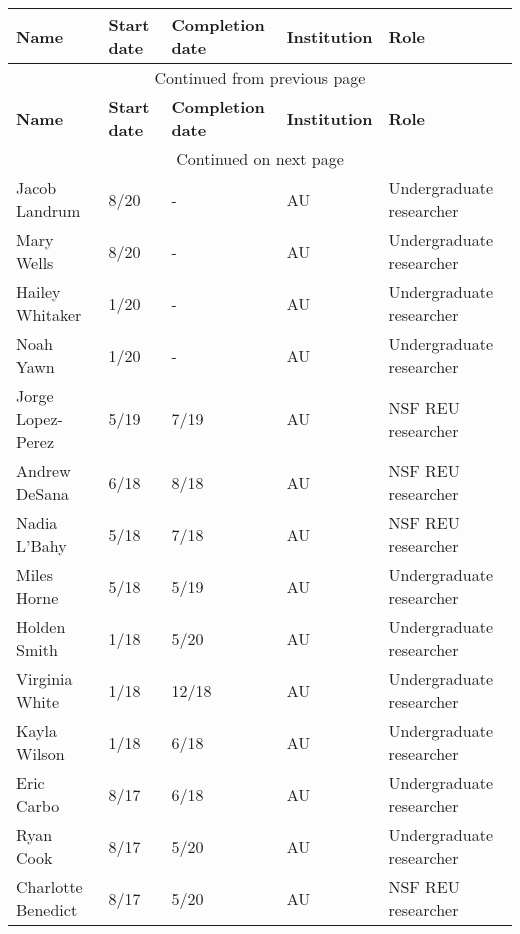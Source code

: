 {\sffamily\small
{}
\begin{longtable}[l]{ p{1.2in} p{0.5in} p{0.8in}p{0.75in} p{2in} }
    \hline
    \textbf{Name} & \textbf{Start date} & \textbf{Completion date} & \textbf{Institution} & \textbf{Role} \\
    \hline
    \endfirsthead
    \multicolumn{5}{c}{{Continued from previous page}} \\
    \hline
    \textbf{Name} & \textbf{Start date} & \textbf{Completion date} & \textbf{Institution} & \textbf{Role} \\
    \hline
    \endhead
    \hline \multicolumn{5}{c}{{Continued on next page}} \\
    \endfoot
    \hline
    \endlastfoot
    Jacob Landrum & 8/20 & - & AU & Undergraduate researcher \\
    Mary Wells & 8/20 & - & AU & Undergraduate researcher \\
    Hailey Whitaker & 1/20 & - & AU & Undergraduate researcher \\
    Noah Yawn & 1/20 & - & AU & Undergraduate researcher \\
    Jorge Lopez-Perez & 5/19 & 7/19 & AU & NSF REU researcher \\
    Andrew DeSana & 6/18 & 8/18 & AU & NSF REU researcher \\
    Nadia L'Bahy & 5/18 & 7/18 & AU & NSF REU researcher \\
    Miles Horne & 5/18 & 5/19 & AU & Undergraduate researcher \\
    Holden Smith & 1/18 & 5/20 & AU & Undergraduate researcher \\
    Virginia White & 1/18 & 12/18 & AU & Undergraduate researcher \\
    Kayla Wilson & 1/18 & 6/18 & AU & Undergraduate researcher \\
    Eric Carbo & 8/17 & 6/18 & AU & Undergraduate researcher \\
    Ryan Cook & 8/17 & 5/20 & AU & Undergraduate researcher \\
    Charlotte Benedict & 8/17 & 5/20 & AU & NSF REU researcher \\
\end{longtable}
}
